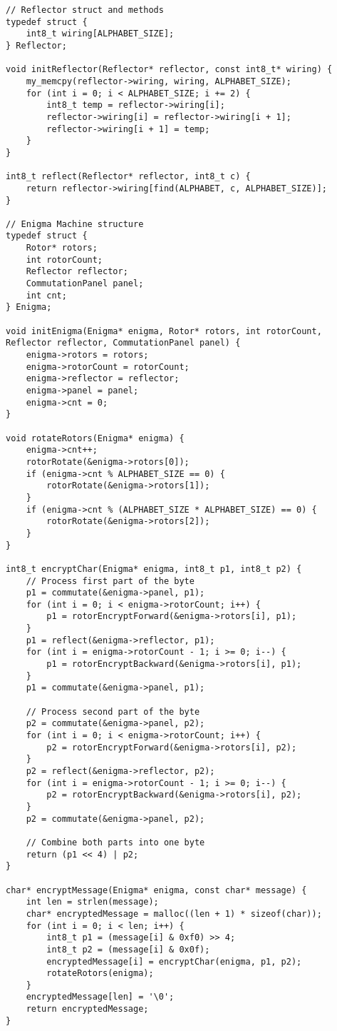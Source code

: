 \begin{center}
\begin{lstlisting}[label=lst:enigma1,caption=Реализация алгоритма шифрования машины <<Энигма>>]
// Reflector struct and methods
typedef struct {
	int8_t wiring[ALPHABET_SIZE];
} Reflector;

void initReflector(Reflector* reflector, const int8_t* wiring) {
	my_memcpy(reflector->wiring, wiring, ALPHABET_SIZE);
	for (int i = 0; i < ALPHABET_SIZE; i += 2) {
		int8_t temp = reflector->wiring[i];
		reflector->wiring[i] = reflector->wiring[i + 1];
		reflector->wiring[i + 1] = temp;
	}
}

int8_t reflect(Reflector* reflector, int8_t c) {
	return reflector->wiring[find(ALPHABET, c, ALPHABET_SIZE)];
}

// Enigma Machine structure
typedef struct {
	Rotor* rotors;
	int rotorCount;
	Reflector reflector;
	CommutationPanel panel;
	int cnt;
} Enigma;

void initEnigma(Enigma* enigma, Rotor* rotors, int rotorCount, Reflector reflector, CommutationPanel panel) {
	enigma->rotors = rotors;
	enigma->rotorCount = rotorCount;
	enigma->reflector = reflector;
	enigma->panel = panel;
	enigma->cnt = 0;
}

void rotateRotors(Enigma* enigma) {
	enigma->cnt++;
	rotorRotate(&enigma->rotors[0]);
	if (enigma->cnt % ALPHABET_SIZE == 0) {
		rotorRotate(&enigma->rotors[1]);
	}
	if (enigma->cnt % (ALPHABET_SIZE * ALPHABET_SIZE) == 0) {
		rotorRotate(&enigma->rotors[2]);
	}
}

int8_t encryptChar(Enigma* enigma, int8_t p1, int8_t p2) {
	// Process first part of the byte
	p1 = commutate(&enigma->panel, p1);
	for (int i = 0; i < enigma->rotorCount; i++) {
		p1 = rotorEncryptForward(&enigma->rotors[i], p1);
	}
	p1 = reflect(&enigma->reflector, p1);
	for (int i = enigma->rotorCount - 1; i >= 0; i--) {
		p1 = rotorEncryptBackward(&enigma->rotors[i], p1);
	}
	p1 = commutate(&enigma->panel, p1);
	
	// Process second part of the byte
	p2 = commutate(&enigma->panel, p2);
	for (int i = 0; i < enigma->rotorCount; i++) {
		p2 = rotorEncryptForward(&enigma->rotors[i], p2);
	}
	p2 = reflect(&enigma->reflector, p2);
	for (int i = enigma->rotorCount - 1; i >= 0; i--) {
		p2 = rotorEncryptBackward(&enigma->rotors[i], p2);
	}
	p2 = commutate(&enigma->panel, p2);
	
	// Combine both parts into one byte
	return (p1 << 4) | p2;
}

char* encryptMessage(Enigma* enigma, const char* message) {
	int len = strlen(message);
	char* encryptedMessage = malloc((len + 1) * sizeof(char));  
	for (int i = 0; i < len; i++) {
		int8_t p1 = (message[i] & 0xf0) >> 4;
		int8_t p2 = (message[i] & 0x0f);
		encryptedMessage[i] = encryptChar(enigma, p1, p2);
		rotateRotors(enigma);
	}
	encryptedMessage[len] = '\0'; 
	return encryptedMessage;
}


\end{lstlisting}
\end{center}
